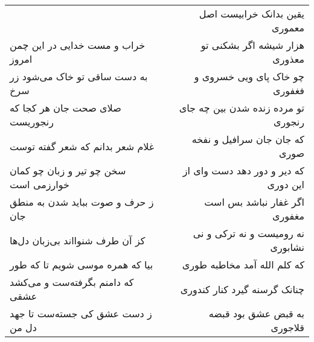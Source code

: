 \begin{center}
\begin{longtable}{l p{0.5cm} r}
&&
یقین بدانک خرابیست اصل معموری
\\
خراب و مست خدایی در این چمن امروز
&&
هزار شیشه اگر بشکنی تو معذوری
\\
به دست ساقی تو خاک می‌شود زر سرخ
&&
چو خاک پای ویی خسروی و فغفوری
\\
صلای صحت جان هر کجا که رنجوریست
&&
تو مرده زنده شدن بین چه جای رنجوری
\\
غلام شعر بدانم که شعر گفته توست
&&
که جان جان سرافیل و نفخه صوری
\\
سخن چو تیر و زبان چو کمان خوارزمی است
&&
که دیر و دور دهد دست وای از این دوری
\\
ز حرف و صوت بباید شدن به منطق جان
&&
اگر غفار نباشد بس است مغفوری
\\
کز آن طرف شنوااند بی‌زبان دل‌ها
&&
نه رومیست و نه ترکی و نی نشابوری
\\
بیا که همره موسی شویم تا که طور
&&
که کلم الله آمد مخاطبه طوری
\\
که دامنم بگرفته‌ست و می‌کشد عشقی
&&
چنانک گرسنه گیرد کنار کندوری
\\
ز دست عشق کی جسته‌ست تا جهد دل من
&&
به قبض عشق بود قبضه قلاجوری
\\
\end{longtable}
\end{center}
